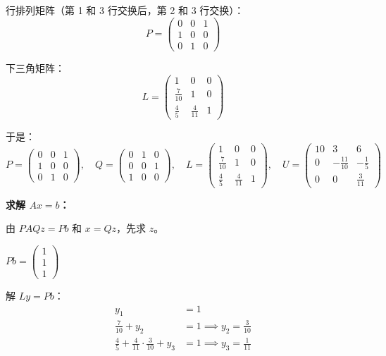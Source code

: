 \documentclass{article}
\begin{document}
\begin{solution}
  行排列矩阵（第 1 和 3 行交换后，第 2 和 3 行交换）：
  \[
    P =
    \begin{pmatrix}
      0 & 0 & 1 \\
      1 & 0 & 0 \\
      0 & 1 & 0
    \end{pmatrix}
  \]

  下三角矩阵：
  \[
    L =
    \begin{pmatrix}
      1 & 0 & 0 \\
      \frac{7}{10} & 1 & 0 \\
      \frac{4}{5} & \frac{4}{11} & 1
    \end{pmatrix}
  \]

  于是：
  \[
    \boxed{
      P =
      \begin{pmatrix}
        0 & 0 & 1 \\
        1 & 0 & 0 \\
        0 & 1 & 0
      \end{pmatrix}, \quad
      Q =
      \begin{pmatrix}
        0 & 1 & 0 \\
        0 & 0 & 1 \\
        1 & 0 & 0
      \end{pmatrix}, \quad
      L =
      \begin{pmatrix}
        1 & 0 & 0 \\
        \frac{7}{10} & 1 & 0 \\
        \frac{4}{5} & \frac{4}{11} & 1
      \end{pmatrix}, \quad
      U =
      \begin{pmatrix}
        10 & 3 & 6 \\
        0 & -\frac{11}{10} & -\frac{1}{5} \\
        0 & 0 & \frac{3}{11}
      \end{pmatrix}
    }
  \]

  \textbf{求解 $Ax = b$：}

  由 $PAQz = Pb$ 和 $x = Qz$，先求 $z$。

  $Pb =
  \begin{pmatrix}1\\1\\1
  \end{pmatrix}$

  解 $Ly = Pb$：
  \begin{align*}
    y_1 &= 1 \\
    \frac{7}{10} + y_2 &= 1 \implies y_2 = \frac{3}{10} \\
    \frac{4}{5} + \frac{4}{11} \cdot \frac{3}{10} + y_3 &= 1 \implies
    y_3 = \frac{1}{11}
  \end{align*}


\end{solution}
\end{document}
